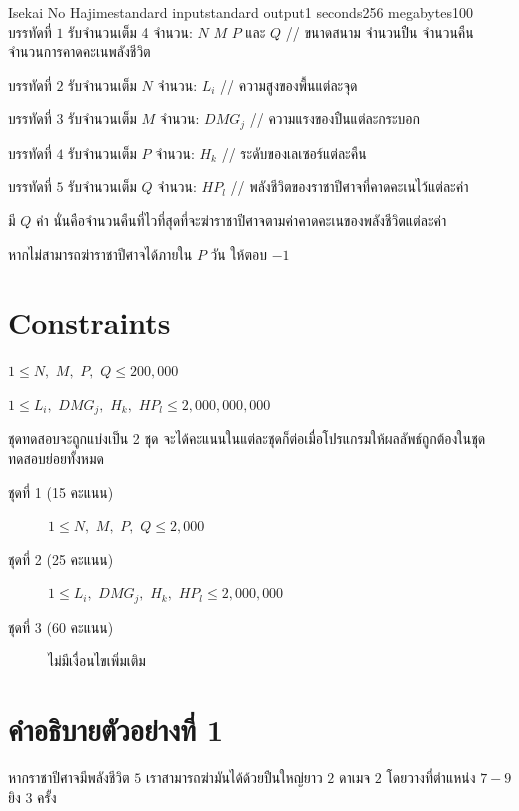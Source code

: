 \documentclass[11pt,a4paper]{article}
\begin{document}
\begin{problem}{Isekai No Hajime}{standard input}{standard output}{1 seconds}{256 megabytes}{100}
\InputFile
บรรทัดที่ $1$ รับจำนวนเต็ม 4 จำนวน: $N$ $M$ $P$ และ $Q$ // ขนาดสนาม จำนวนปืน จำนวนคืน จำนวนการคาดคะเนพลังชีวิต

บรรทัดที่ $2$ รับจำนวนเต็ม $N$ จำนวน: $L_i$ // ความสูงของพื้นแต่ละจุด

บรรทัดที่ $3$ รับจำนวนเต็ม $M$ จำนวน: $DMG_j$ // ความแรงของปืนแต่ละกระบอก

บรรทัดที่ $4$ รับจำนวนเต็ม $P$ จำนวน: $H_k$ // ระดับของเลเซอร์แต่ละคืน

บรรทัดที่ $5$ รับจำนวนเต็ม $Q$ จำนวน: $HP_l$ // พลังชีวิตของราชาปีศาจที่คาดคะเนไว้แต่ละค่า

\OutputFile
มี $Q$ ค่า นั่นคือจำนวนคืนที่ไวที่สุดที่จะฆ่าราชาปีศาจตามค่าคาดคะเนของพลังชีวิตแต่ละค่า

หากไม่สามารถฆ่าราชาปีศาจได้ภายใน $P$ วัน ให้ตอบ $-1$

\section*{Constraints}

$1 \leq N,$ $M,$ $P,$ $Q \leq 200,000$

$1 \leq L_i,$ $DMG_j,$ $H_k,$ $HP_l \leq 2,000,000,000$
  
\Scoring
ชุดทดสอบจะถูกแบ่งเป็น 2 ชุด จะได้คะแนนในแต่ละชุดก็ต่อเมื่อโปรแกรมให้ผลลัพธ์ถูกต้องในชุดทดสอบย่อยทั้งหมด

\begin{description}

\item[ชุดที่ 1 (15 คะแนน)]  $1 \leq N,$ $M,$ $P,$ $Q \leq 2,000$ 

\item[ชุดที่ 2 (25 คะแนน)]  $1 \leq L_i,$ $DMG_j,$ $H_k,$ $HP_l \leq 2,000,000$

\item[ชุดที่ 3 (60 คะแนน)] ไม่มีเงื่อนไขเพิ่มเติม

\end{description}

\Examples

\begin{example}
%
%
\end{example}

\section*{คำอธิบายตัวอย่างที่ 1}
หากราชาปีศาจมีพลังชีวิต $5$ เราสามารถฆ่ามันได้ด้วยปืนใหญ่ยาว $2$ ดาเมจ $2$ โดยวางที่ตำแหน่ง $7 - 9$ ยิง $3$ ครั้ง


\end{problem}
\end{document}
